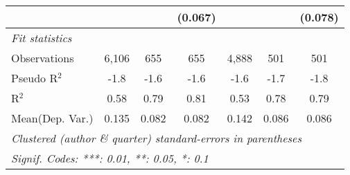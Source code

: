 \begin{tabular}{lcccccc}
                                  &               &              & (0.067)        &               &              & (0.078)\\   
   \midrule
   \emph{Fit statistics}\\
   Observations                   & 6,106         & 655          & 655            & 4,888         & 501          & 501\\  
   Pseudo R$^2$                   & -1.8          & -1.6         & -1.6           & -1.6          & -1.7         & -1.8\\  
   R$^2$                          & 0.58          & 0.79         & 0.81           & 0.53          & 0.78         & 0.79\\  
Mean(Dep. Var.) & 0.135 & 0.082 & 0.082 & 0.142 & 0.086 & 0.086 \\
   \midrule \midrule
   \multicolumn{7}{l}{\emph{Clustered (author \& quarter) standard-errors in parentheses}}\\
   \multicolumn{7}{l}{\emph{Signif. Codes: ***: 0.01, **: 0.05, *: 0.1}}\\
\end{tabular}
\par\endgroup
